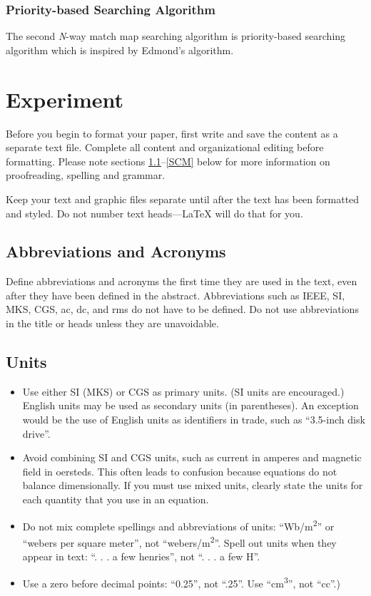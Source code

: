 \documentclass[conference]{IEEEtran}
\begin{document}
\subsubsection{Priority-based Searching Algorithm}
The second \textit{N}-way match map searching algorithm is priority-based searching algorithm which is inspired by Edmond's
algorithm.

\section{Experiment}
Before you begin to format your paper, first write and save the content as a 
separate text file. Complete all content and organizational editing before 
formatting. Please note sections \ref{AA}--\ref{SCM} below for more information on 
proofreading, spelling and grammar.

Keep your text and graphic files separate until after the text has been 
formatted and styled. Do not number text heads---{\LaTeX} will do that 
for you.

\subsection{Abbreviations and Acronyms}\label{AA}
Define abbreviations and acronyms the first time they are used in the text, 
even after they have been defined in the abstract. Abbreviations such as 
IEEE, SI, MKS, CGS, ac, dc, and rms do not have to be defined. Do not use 
abbreviations in the title or heads unless they are unavoidable.

\subsection{Units}
\begin{itemize}
\item Use either SI (MKS) or CGS as primary units. (SI units are encouraged.) English units may be used as secondary units (in parentheses). An exception would be the use of English units as identifiers in trade, such as ``3.5-inch disk drive''.
\item Avoid combining SI and CGS units, such as current in amperes and magnetic field in oersteds. This often leads to confusion because equations do not balance dimensionally. If you must use mixed units, clearly state the units for each quantity that you use in an equation.
\item Do not mix complete spellings and abbreviations of units: ``Wb/m\textsuperscript{2}'' or ``webers per square meter'', not ``webers/m\textsuperscript{2}''. Spell out units when they appear in text: ``. . . a few henries'', not ``. . . a few H''.
\item Use a zero before decimal points: ``0.25'', not ``.25''. Use ``cm\textsuperscript{3}'', not ``cc''.)
\end{itemize}
\end{document}
